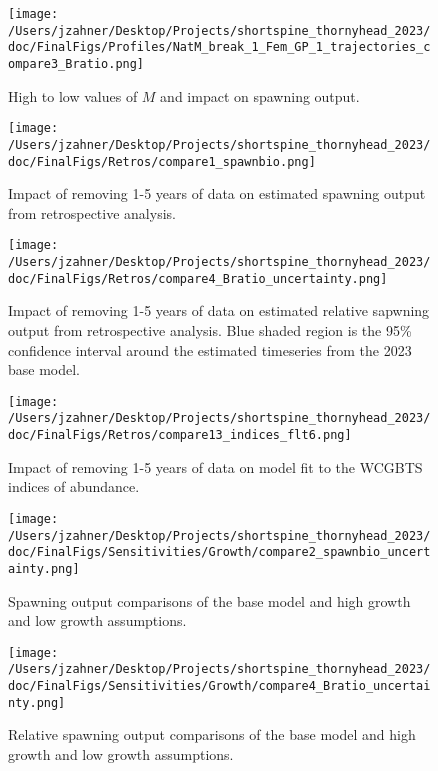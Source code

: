 \documentclass[11pt,
  english,
  letterpaper,
]{article}
\begin{document}
\begin{figure}
\centering
\texttt{[image: /Users/jzahner/Desktop/Projects/shortspine\_thornyhead\_2023/doc/FinalFigs/Profiles/NatM\_break\_1\_Fem\_GP\_1\_trajectories\_compare3\_Bratio.png]}
\caption{High to low values of \(M\) and impact on spawning output.\label{fig:M_spawnout}}
\end{figure}

\clearpage

\begin{figure}
\centering
\texttt{[image: /Users/jzahner/Desktop/Projects/shortspine\_thornyhead\_2023/doc/FinalFigs/Retros/compare1\_spawnbio.png]}
\caption{Impact of removing 1-5 years of data on estimated spawning output from retrospective analysis.\label{fig:retros_spawnbio}}
\end{figure}

\begin{figure}
\centering
\texttt{[image: /Users/jzahner/Desktop/Projects/shortspine\_thornyhead\_2023/doc/FinalFigs/Retros/compare4\_Bratio\_uncertainty.png]}
\caption{Impact of removing 1-5 years of data on estimated relative sapwning output from retrospective analysis. Blue shaded region is the 95\% confidence interval around the estimated timeseries from the 2023 base model.\label{fig:retros_bratio_uncertainty}}
\end{figure}

\begin{figure}
\centering
\texttt{[image: /Users/jzahner/Desktop/Projects/shortspine\_thornyhead\_2023/doc/FinalFigs/Retros/compare13\_indices\_flt6.png]}
\caption{Impact of removing 1-5 years of data on model fit to the WCGBTS indices of abundance.\label{fig:retros_indices}}
\end{figure}

\begin{figure}
\centering
\texttt{[image: /Users/jzahner/Desktop/Projects/shortspine\_thornyhead\_2023/doc/FinalFigs/Sensitivities/Growth/compare2\_spawnbio\_uncertainty.png]}
\caption{Spawning output comparisons of the base model and high growth and low growth assumptions.\label{fig:growth_sensitiv_spawning}}
\end{figure}

\begin{figure}
\centering
\texttt{[image: /Users/jzahner/Desktop/Projects/shortspine\_thornyhead\_2023/doc/FinalFigs/Sensitivities/Growth/compare4\_Bratio\_uncertainty.png]}
\caption{Relative spawning output comparisons of the base model and high growth and low growth assumptions.\label{fig:growth_sensitiv_mngmt}}
\end{figure}
\end{document}

